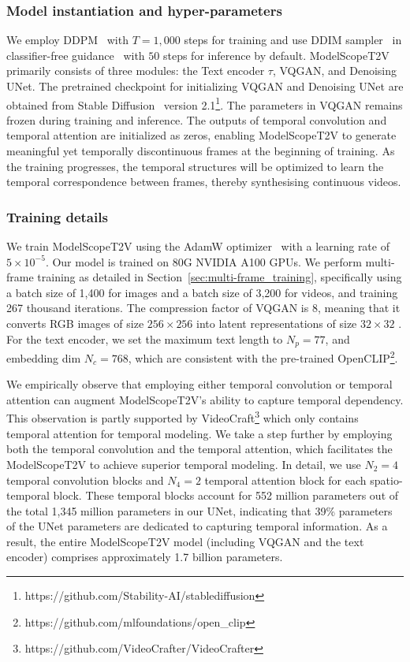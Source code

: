 \subsubsection{Model instantiation and hyper-parameters}
We employ DDPM~\cite{ho2020denoising} with $T = 1,000$ steps for training and use DDIM sampler~\cite{song2020denoising} in classifier-free guidance~\cite{ho2022classifier} with $50$ steps for inference by default.
ModelScopeT2V primarily consists of three modules: the Text encoder $\tau$, VQGAN, and Denoising UNet. 
The pretrained checkpoint for initializing VQGAN and Denoising UNet are obtained from Stable Diffusion~\cite{rombach2022high} version 2.1\footnote{https://github.com/Stability-AI/stablediffusion}.
The parameters in VQGAN remains frozen during training and inference.
The outputs of temporal convolution and temporal attention are initialized as zeros, enabling ModelScopeT2V to generate meaningful yet temporally discontinuous frames at the beginning of training.
As the training progresses, the temporal structures will be optimized to learn the temporal correspondence between frames, thereby synthesising continuous videos.



\subsubsection{Training details}

We train ModelScopeT2V using the AdamW optimizer~\cite{loshchilov2017AdamW} with a learning rate of $5\times 10^{-5}$.
Our model is trained on 80G NVIDIA A100 GPUs.
We perform multi-frame training as detailed in Section~\ref{sec:multi-frame_training}, specifically using a batch size of 1,400 for images and a batch size of 3,200 for videos, and training 267 thousand iterations. 
The compression factor of VQGAN is 8, meaning that it converts RGB images of size $256 \times 256$ into latent representations of size $32 \times 32$ .
For the text encoder, we set the maximum text length to $N_p=77$, and embedding dim $N_c=768$, which are consistent with the pre-trained OpenCLIP\footnote{https://github.com/mlfoundations/open\_clip}.


We empirically observe that employing either temporal convolution or temporal attention can augment ModelScopeT2V's ability to capture temporal dependency.
This observation is partly supported by VideoCraft\footnote{https://github.com/VideoCrafter/VideoCrafter} which only contains temporal attention for temporal modeling.
We take a step further by employing both the temporal convolution and the temporal attention, which facilitates the ModelScopeT2V to achieve superior temporal modeling.
In detail, we use $N_2 = 4$ temporal convolution blocks and $N_4 = 2$ temporal attention block for each spatio-temporal block.
These temporal blocks account for 552 million parameters out of the total 1,345 million parameters in our UNet, indicating that 39\% parameters of the UNet parameters are dedicated to capturing temporal information. 
As a result, the entire ModelScopeT2V model (including VQGAN and the text encoder) comprises approximately 1.7 billion parameters.



